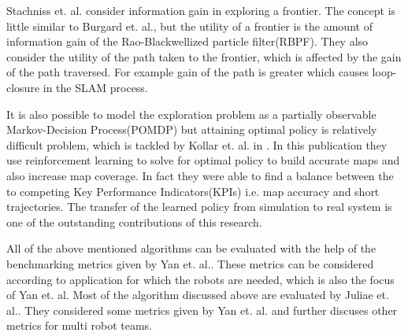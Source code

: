 Stachniss et. al.\cite{Stachniss2005} consider information gain in exploring a frontier. The concept
is little similar to Burgard et. al., but the utility of a frontier is the amount of information
gain of the Rao-Blackwellized particle filter(RBPF). They also consider the utility of the path
taken to the frontier, which is affected by the gain of the path traversed. For example gain of the
path is greater which causes loop-closure in the SLAM process. \par

It is also possible to model the exploration problem as a partially observable Markov-Decision
Process(POMDP) but attaining optimal policy is relatively difficult problem, which is tackled by
Kollar et. al. in \cite{Kollar2008}. In this publication they use reinforcement learning to solve
for optimal policy to build accurate maps and also increase map coverage. In fact they were able to
find a balance between the to competing Key Performance Indicators(KPIs) i.e. map accuracy and short
trajectories. The transfer of the learned policy from simulation to real system is one of the
outstanding contributions of this research.\par

All of the above mentioned algorithms can be evaluated with the help of the benchmarking metrics
given by Yan et. al.\cite{Yan2015}. These metrics can be considered according to application for
which the robots are needed, which is also the focus of Yan et. al. Most of the algorithm discussed
above are evaluated by Juliae et. al.\cite{Juliae2012}. They considered some metrics given by
Yan et. al. and further discuses other metrics for multi robot teams.
